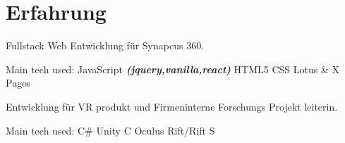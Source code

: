 \documentclass[a4paper]{deedy-resume_twopage} %
\begin{document}

\lastupdated %



\begin{minipage}[t]{0.66\textwidth} %



  \section{Erfahrung}

  \vspace{\topsep} %
  \begin{tightitemize}
  \item Fullstack Web Entwicklung für Synapcus 360.
  \end{tightitemize}
  Main tech used: \textbullet{} JavaScript {\footnotesize \textit{\textbf{(jquery,vanilla,react)}}} \textbullet{} HTML5 \textbullet{} CSS \textbullet{} Lotus \& X Pages

  \sectionspace %



  \begin{tightitemize}
  \item Entwicklung für VR produkt und Firmeninterne Forschungs Projekt leiterin.
  \end{tightitemize}
  Main tech used: \textbullet{} C\# \textbullet{} Unity \textbullet{} C \textbullet{} Oculus Rift/Rift S


\end{minipage}
\end{document}
